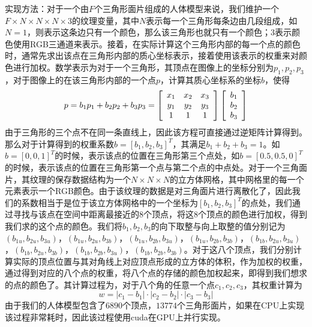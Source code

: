 实现方法：对于一个由\(F\)个三角形面片组成的人体模型来说，我们维护一个\(F\times N\times N\times N \times 3\)的纹理变量，其中\(N\)表示每一个三角形每条边由几段组成，如\(N=1\)，则表示这条边只有一个颜色，那么该三角形也就只有一个颜色；3表示颜色使用RGB三通道来表示。接着，在实际计算这个三角形内部的每一个点的颜色时，通常先求出该点在三角形内部的质心坐标表示，接着使用该表示的权重来对颜色进行加权。数学表示为对于一个三角形，其顶点在图像上的坐标分别为\(p_1, p_2, p_3\)，对于图像上的在该三角形内部的一个点\(p\)，计算其质心坐标系的坐标\(b\)，使得
\begin{equation}
    p = b_1p_1 + b_2p_2 + b_3p_3 = \left[ \begin{array} { c c c } { x _ { 1 } } & { x _ { 2 } } & { x _ { 3 } } \\ { y _ { 1 } } & { y _ { 2 } } & { y _ { 3 } } \\ { 1 } & { 1 } & { 1 } \end{array} \right]\left[ \begin{array} { c} b_1 \\ b_2 \\ b_3 \end{array} \right]
\end{equation}
由于三角形的三个点不在同一条直线上，因此该方程可直接通过逆矩阵计算得到。那么对于计算得到的权重系数\(b = [b_1, b_2, b_3]^T\)，其满足\(b_1+b_2+b_3=1\)。如\(b=[0,0,1]^T\)的时候，表示该点的位置在三角形第三个点处，如\(b=[0.5,0.5,0]^T\)的时候，表示该点的位置在三角形第一个点与第二个点的中点处。对于一个三角面片，其纹理的保存数据结构为一个\(N\times N\times N\)的立方体网格，其中网格里的每一个元素表示一个RGB颜色。由于该纹理的数据是对三角面片进行离散化了，因此我们的系数相当于是位于该立方体网格中的一个坐标为\([b_1, b_2,b_3]^T\)的点处，我们通过寻找与该点在空间中距离最接近的8个顶点，将这8个顶点的颜色进行加权，得到我们求的这个点的颜色。我们将\(b_1, b_2,b_3\)的向下取整与向上取整的值分别记为\((b_{1u},b_{2u},b_{3u})\)，\((b_{1u},b_{2u},b_{3b})\)，\((b_{1u},b_{2b},b_{3u})\)，\((b_{1u},b_{2b},b_{3b})\)，\((b_{1b},b_{2u},b_{3u})\)，\((b_{1b},b_{2u},b_{3b})\)，\((b_{1b},b_{2b},b_{3u})\)，\((b_{1b},b_{2b},b_{3b})\)。对于这八个顶点，我们分别计算实际的顶点位置与其对角线上对应顶点形成的立方体的体积，作为加权的权重，通过得到对应的八个点的权重，将八个点的存储的颜色加权起来，即得到我们想求的点的颜色了。其计算过程为，对于八个角的任意一个点\(c_1,c_2,c_3\)，其权重计算为
\begin{equation}
    w = |c_1 - b_1|\cdot |c_2 - b_2| \cdot |c_3 - b_3|
\end{equation}
由于我们的人体模型包含了\(6890\)个顶点，\(13774\)个三角形面片，如果在CPU上实现该过程非常耗时，因此该过程使用cuda在GPU上并行实现。

